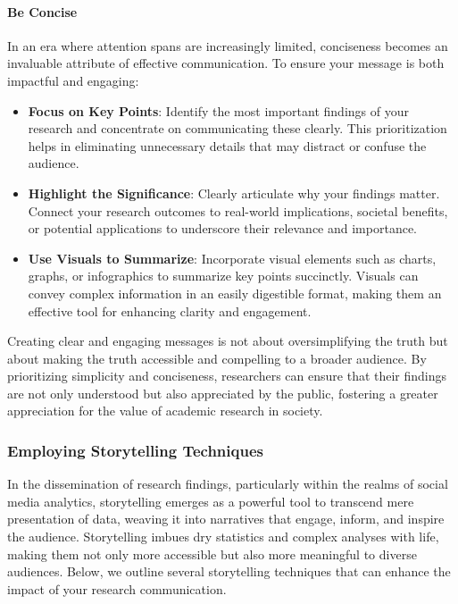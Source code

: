 \documentclass[
]{book}
\begin{document}
\hypertarget{be-concise}{%
\paragraph{Be Concise}\label{be-concise}}

In an era where attention spans are increasingly limited, conciseness becomes an invaluable attribute of effective communication. To ensure your message is both impactful and engaging:

\begin{itemize}
\item
  \textbf{Focus on Key Points}: Identify the most important findings of your research and concentrate on communicating these clearly. This prioritization helps in eliminating unnecessary details that may distract or confuse the audience.
\item
  \textbf{Highlight the Significance}: Clearly articulate why your findings matter. Connect your research outcomes to real-world implications, societal benefits, or potential applications to underscore their relevance and importance.
\item
  \textbf{Use Visuals to Summarize}: Incorporate visual elements such as charts, graphs, or infographics to summarize key points succinctly. Visuals can convey complex information in an easily digestible format, making them an effective tool for enhancing clarity and engagement.
\end{itemize}

Creating clear and engaging messages is not about oversimplifying the truth but about making the truth accessible and compelling to a broader audience. By prioritizing simplicity and conciseness, researchers can ensure that their findings are not only understood but also appreciated by the public, fostering a greater appreciation for the value of academic research in society.

\hypertarget{employing-storytelling-techniques-1}{%
\subsubsection*{Employing Storytelling Techniques}\label{employing-storytelling-techniques-1}}

In the dissemination of research findings, particularly within the realms of social media analytics, storytelling emerges as a powerful tool to transcend mere presentation of data, weaving it into narratives that engage, inform, and inspire the audience. Storytelling imbues dry statistics and complex analyses with life, making them not only more accessible but also more meaningful to diverse audiences. Below, we outline several storytelling techniques that can enhance the impact of your research communication.
\end{document}
